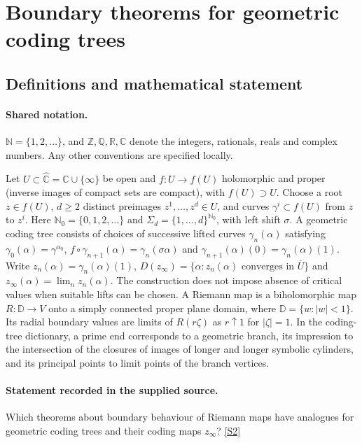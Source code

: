 \documentclass[11pt]{article}
\newcommand{\sref}[2]{\hyperlink{source:#1:#2}{[S#2]}}
\begin{document}
\section{Boundary theorems for geometric coding trees}\label{statement}

\subsection{Definitions and mathematical statement}

\paragraph{Shared notation.}$\mathbb N=\{1,2,\ldots\}$, and $\mathbb Z,\mathbb Q,\mathbb R,\mathbb C$ denote the integers, rationals, reals and complex numbers. Any other conventions are specified locally.


Let $U\subset\widehat{\mathbb C}=\mathbb C\cup\{\infty\}$ be open and $f:U\to f(U)$ holomorphic and proper (inverse images of compact sets are compact), with $f(U)\supset U$. Choose a root $z\in f(U)$, $d\geq2$ distinct preimages $z^1,\ldots,z^d\in U$, and curves $\gamma^i\subset f(U)$ from $z$ to $z^i$. Here $\mathbb N_0=\{0,1,2,\ldots\}$ and $\Sigma_d=\{1,\ldots,d\}^{\mathbb N_0}$, with left shift $\sigma$. A geometric coding tree consists of choices of successive lifted curves $\gamma_n(\alpha)$ satisfying $\gamma_0(\alpha)=\gamma^{\alpha_0}$, $f\circ\gamma_{n+1}(\alpha)=\gamma_n(\sigma\alpha)$ and $\gamma_{n+1}(\alpha)(0)=\gamma_n(\alpha)(1)$. Write $z_n(\alpha)=\gamma_n(\alpha)(1)$, $D(z_\infty)=\{\alpha:z_n(\alpha)\text{ converges in }\overline U\}$ and $z_\infty(\alpha)=\lim_n z_n(\alpha)$. The construction does not impose absence of critical values when suitable lifts can be chosen. A Riemann map is a biholomorphic map $R:\mathbb D\to V$ onto a simply connected proper plane domain, where $\mathbb D=\{w:|w|<1\}$. Its radial boundary values are limits of $R(r\zeta)$ as $r\uparrow1$ for $|\zeta|=1$. In the coding-tree dictionary, a prime end corresponds to a geometric branch, its impression to the intersection of the closures of images of longer and longer symbolic cylinders, and its principal points to limit points of the branch vertices.
\paragraph{Statement recorded in the supplied source.}
Which theorems about boundary behaviour of Riemann maps have analogues for geometric coding trees and their coding maps $z_\infty$? \sref{statement}{2}
\end{document}
